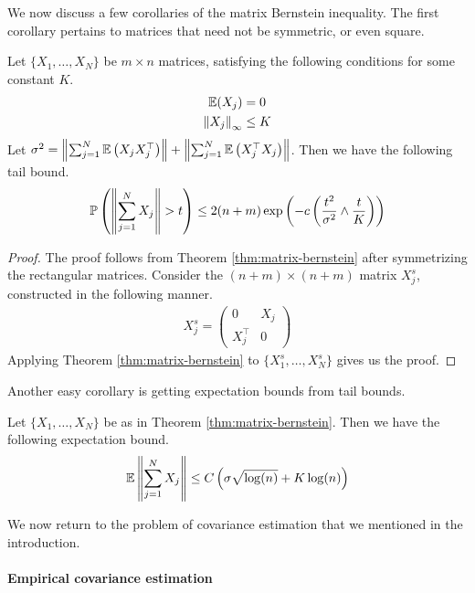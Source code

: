 \documentclass[11pt]{article}
\begin{document}
We now discuss a few corollaries of the matrix Bernstein inequality.
The first corollary pertains to matrices that need not be symmetric, or even square.

\begin{corollary}
  Let $\{X_1, \ldots, X_N\}$ be $m \times n$ matrices, satisfying the following conditions for some constant $K$.
  \begin{align*}
    \mathbb{E}(X_j) &= 0 \\
    \left\lVert X_j\right\rVert_{\infty} &\leq K
  \end{align*}
  Let $\sigma^2 = \left\lVert\sum_{j=1}^N \mathbb{E}\left( X_j X_j^{\top} \right)\right\rVert + \left\lVert\sum_{j=1}^N \mathbb{E}\left( X_j^{\top}X_j \right)\right\rVert$.
  Then we have the following tail bound.
  \begin{align*}
    \mathbb{P}\left( \left\lVert\sum_{j=1}^N X_j\right\rVert > t \right)
    \leq 2(n+m) \exp\left( -c \left( \frac{t^2}{\sigma^2} \wedge \frac{t}{K} \right) \right)
  \end{align*}
\end{corollary}
\begin{proof}
  The proof follows from Theorem \ref{thm:matrix-bernstein} after symmetrizing the rectangular matrices.
  Consider the $(n+m) \times (n+m)$ matrix $X_j^s$, constructed in the following manner.
  \begin{align*}
    X_j^s =
    \begin{pmatrix}
      0 & X_j  \\
      X_j^{\top} & 0
    \end{pmatrix}
  \end{align*}
  Applying Theorem \ref{thm:matrix-bernstein} to $\{X_1^s, \ldots, X_N^s\}$ gives us the proof.
\end{proof}

Another easy corollary is getting expectation bounds from tail bounds.
\begin{corollary}
  \label{cor:exp-bound}
  Let $\{X_1, \ldots, X_N\}$ be as in Theorem \ref{thm:matrix-bernstein}. Then we have the following expectation bound.
  \begin{align*}
    \mathbb{E} \left\lVert\sum_{j=1}^N X_j\right\rVert \leq C \left( \sigma \sqrt{\log(n)} + K \log(n) \right)
  \end{align*}
\end{corollary}

We now return to the problem of covariance estimation that we mentioned in the introduction.

\paragraph{Empirical covariance estimation}
\end{document}
